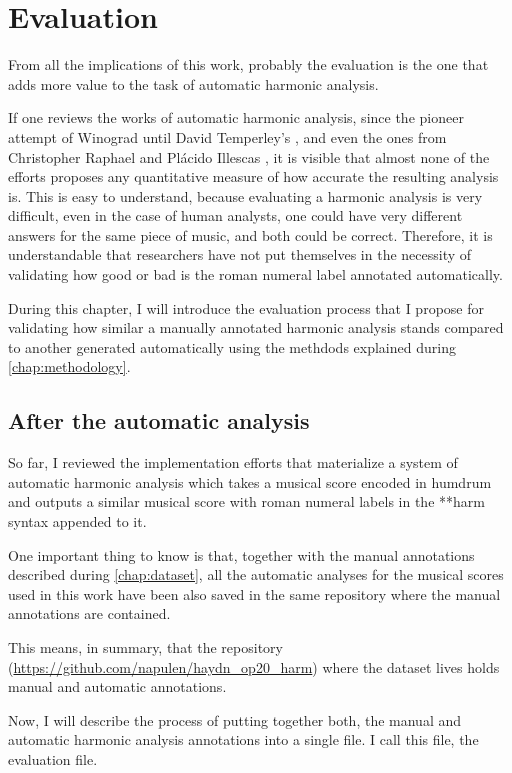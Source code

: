 \chapter{Evaluation}
\label{chap:evaluation}
From all the implications of this work, probably the evaluation is the one that adds more value to the task of automatic harmonic analysis.

If one reviews the works of automatic harmonic analysis, since the pioneer attempt of Winograd \cite{winograd1968linguistics} until David Temperley's \cite{temperley1997algorithm}, and even the ones from Christopher Raphael \cite{raphael2003harmonic} and Pl\'acido Illescas \cite{illescas2007harmonic}, it is visible that almost none of the efforts proposes any quantitative measure of how accurate the resulting analysis is. This is easy to understand, because evaluating a harmonic analysis is very difficult, even in the case of human analysts, one could have very different answers for the same piece of music, and both could be correct. Therefore, it is understandable that researchers have not put themselves in the necessity of validating how good or bad is the roman numeral label annotated automatically.

During this chapter, I will introduce the evaluation process that I propose for validating how similar a manually annotated harmonic analysis stands compared to another generated automatically using the methdods explained during \autoref{chap:methodology}.

\section{After the automatic analysis}
So far, I reviewed the implementation efforts that materialize a system of automatic harmonic analysis which takes a musical score encoded in humdrum and outputs a similar musical score with roman numeral labels in the **harm syntax appended to it.

One important thing to know is that, together with the manual annotations described during \autoref{chap:dataset}, all the automatic analyses for the musical scores used in this work have been also saved in the same repository where the manual annotations are contained.

This means, in summary, that the repository (\url{https://github.com/napulen/haydn_op20_harm}) where the dataset lives holds manual and automatic annotations.

Now, I will describe the process of putting together both, the manual and automatic harmonic analysis annotations into a single file. I call this file, the evaluation file.

